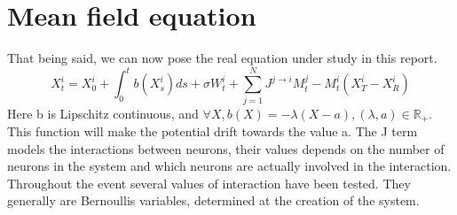 	\section{Mean field equation}
	That being said, we can now pose the real equation under study in this report.\\
	\[
		X_t^i=X_0^i+\int_0^tb(X_s^i)ds+\sigma W_t^i+\sum_{j=1}^NJ^{j\rightarrow i}M_t^j-M_t^i(X_T^i-X_R^i)
	\]
	Here b is Lipschitz continuous, and $\forall X, b(X)=-\lambda(X-a), (\lambda,a)\in\mathbb{R}_+$. This function will make the potential drift towards the value a. The J term models the interactions between neurons, their values depends on the number of neurons in the system and which neurons are actually involved in the interaction. \\
	Throughout the event several values of interaction have been tested. They generally are Bernoullis variables, determined at the creation of the system.\\
